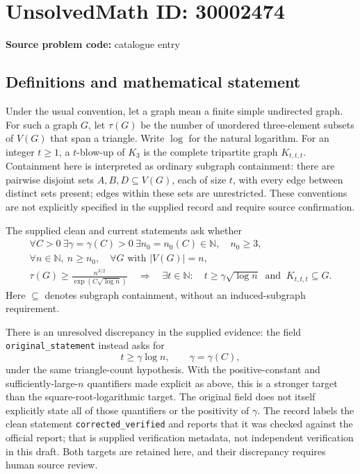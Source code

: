 \documentclass[11pt]{article}
\newcommand{\N}{\mathbb{N}}
\begin{document}
\section*{UnsolvedMath ID: 30002474}
\textbf{Source problem code:} catalogue entry
\subsection{Definitions and mathematical statement}
Under the usual convention, let a graph mean a finite simple undirected graph. For such a graph \(G\), let \(\tau(G)\) be the number of unordered three-element subsets of \(V(G)\) that span a triangle. Write \(\log\) for the natural logarithm. For an integer \(t\geq 1\), a \(t\)-blow-up of \(K_3\) is the complete tripartite graph \(K_{t,t,t}\). Containment here is interpreted as ordinary subgraph containment: there are pairwise disjoint sets \(A,B,D\subseteq V(G)\), each of size \(t\), with every edge between distinct sets present; edges within these sets are unrestricted. These conventions are not explicitly specified in the supplied record and require source confirmation.

The supplied clean and current statements ask whether
\[
\begin{gathered}
\forall C>0\ \exists\gamma=\gamma(C)>0\ \exists n_0=n_0(C)\in\N,\quad n_0\geq 3,\\
\forall n\in\N,\ n\geq n_0,\quad
\forall G\text{ with }|V(G)|=n,\\
\tau(G)\geq \frac{n^{3/2}}{\exp(C\sqrt{\log n})}
\quad\Longrightarrow\quad
\exists t\in\N:\quad t\geq\gamma\sqrt{\log n}
\ \text{ and }\ K_{t,t,t}\subseteq G.
\end{gathered}
\]
Here \(\subseteq\) denotes subgraph containment, without an induced-subgraph requirement.

There is an unresolved discrepancy in the supplied evidence: the field \texttt{original\_statement} instead asks for
\[
 t\geq\gamma\log n,\qquad \gamma=\gamma(C),
\]
under the same triangle-count hypothesis. With the positive-constant and sufficiently-large-\(n\) quantifiers made explicit as above, this is a stronger target than the square-root-logarithmic target. The original field does not itself explicitly state all of those quantifiers or the positivity of \(\gamma\). The record labels the clean statement \texttt{corrected\_verified} and reports that it was checked against the official report; that is supplied verification metadata, not independent verification in this draft. Both targets are retained here, and their discrepancy requires human source review.
\end{document}
